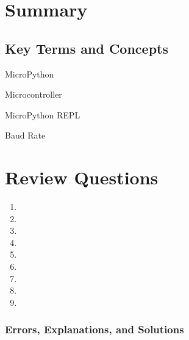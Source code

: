 \documentclass{book}
\newenvironment{problems}{}{}  %
\newenvironment{key_terms}{\begin{multicols}{3}}{\end{multicols}} %
\begin{document}
    
        \newpage
        \section{Summary}\label{summary}

    




    
        \subsection{Key Terms and Concepts}\label{key-terms-and-concepts}
    




    
        \begin{key_terms}
        MicroPython

Microcontroller

MicroPython REPL

Baud Rate
        \end{key_terms}

    




    
        \section{Review Questions}\label{review-questions}
    




    
        \begin{problems}
        \begin{enumerate}
\def\labelenumi{\arabic{enumi}.}
\item
\item
\item
\item
\item
\item
\item
\item
\item
\end{enumerate}
        \end{problems}

    




    
        \subsubsection{Errors, Explanations, and
Solutions}\label{errors-explanations-and-solutions}
\end{document}
